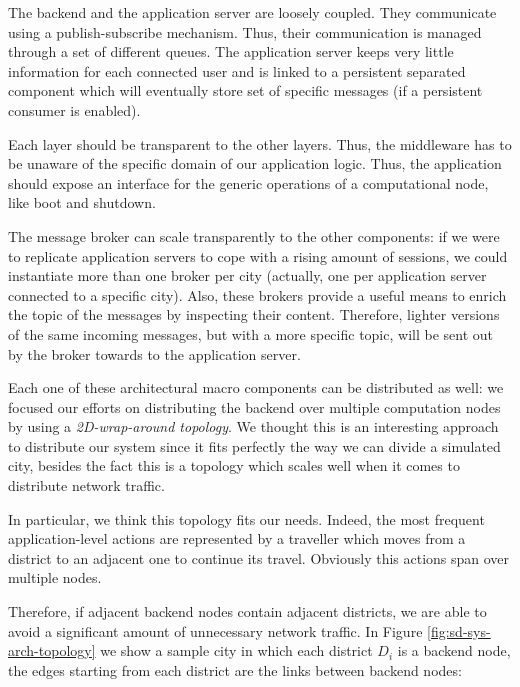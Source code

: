 The backend and
the application server are loosely coupled. They communicate using a
publish-subscribe mechanism. Thus, their
communication is managed through a set of different queues.
The application server keeps very little information for
each connected user and is linked to a persistent separated component
which will eventually store set of specific messages
(if a persistent consumer is enabled).


Each layer should be transparent to the other layers. Thus,
the middleware has to be unaware
of the specific domain of our application logic.
Thus, the application should expose an interface for the generic operations of
a computational node, like boot and shutdown.


The message broker can scale transparently to the other components: if we
were to replicate application servers to cope with a rising amount of
sessions, we could instantiate more than one broker per city (actually, one
per application server connected to a specific city).
Also, these brokers provide a useful means to enrich the topic of the messages
by inspecting their content. Therefore, lighter versions of the
same incoming messages, but with a more specific topic, will be sent out by the
broker towards to the application server.

Each one of these architectural macro components can be distributed as well: we
focused our efforts on distributing the backend over multiple computation nodes
by using a \textit{2D-wrap-around topology}.
We thought this is an interesting approach to distribute our system since it
fits perfectly the way we can divide a simulated city, besides the fact this is
a topology which scales well when it comes to distribute network traffic.

In particular, we think this topology fits our needs. Indeed, the
most frequent application-level actions are
represented by a traveller which moves from a district to an
adjacent one to continue its travel. Obviously this actions span over
multiple nodes.

Therefore, if adjacent backend nodes contain adjacent districts, we are able to
avoid a significant amount of unnecessary network traffic. In Figure
\ref{fig:sd-sys-arch-topology} we show a sample city in which each district
$D_i$ is a backend node, the edges starting from each district are the links
between backend nodes:

